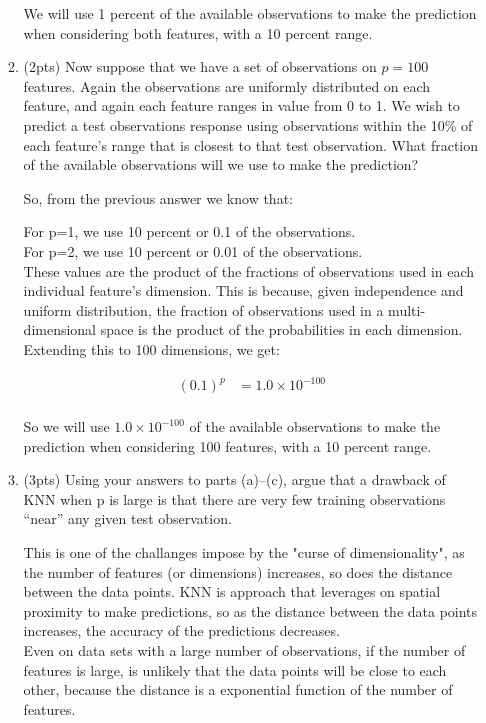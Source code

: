 \documentclass[a4paper]{article}
\theoremstyle{definition}
\newenvironment{soln}{
    \leavevmode\color{blue}\ignorespaces
}{}
\begin{document}
\begin{enumerate}
\begin{enumerate}
\begin{soln}
		We will use 1 percent of the available observations to make the prediction when considering both features, with a 10 percent range. \end{soln}
	
	\item (2pts) Now suppose that we have a set of observations on $p = 100$ features. Again the observations are uniformly distributed on each feature, and again each feature ranges in value from 0 to 1. We wish to predict a test observations response using observations within the 10\% of each feature’s range that is closest to that test observation. What fraction of the available observations will we use to make the prediction?
	
	\begin{soln}  So, from the previous answer we know that:

		For p=1, we use 10 percent or 0.1 of the observations.\\
		For p=2, we use 10 percent or 0.01 of the observations.\\
		
		These values are the product of the fractions of observations used in each individual feature's dimension. This is because, given independence and uniform distribution, the fraction of observations used in a multi-dimensional space is the product of the probabilities in each dimension.\\
		
		Extending this to 100 dimensions, we get:
		
		$$
		\begin{align}
		(0.1)^{p} &= 1.0 \times 10^{-100} \\
		\end{align}
		$$
		
		So we will use $1.0 \times 10^{-100}$ of the available observations to make the prediction when considering 100 features, with a 10 percent range. \end{soln}
	
	\item (3pts) Using your answers to parts (a)–(c), argue that a drawback of KNN when p is large is that there are very few training observations “near” any given test observation.
	
	\begin{soln}  
		This is one of the challanges impose by the "curse of dimensionality", as the number of features (or dimensions) increases, so does the distance between the data points. KNN is approach that leverages on spatial proximity to make predictions, so as the distance between the data points increases, the accuracy of the predictions decreases.\\
		Even on data sets with a large number of observations, if the number of features is large, is unlikely that the data points will be close to each other, because the distance is a exponential function of the number of features. 
	\end{soln}
	

\end{enumerate}
\end{enumerate}
\end{document}
